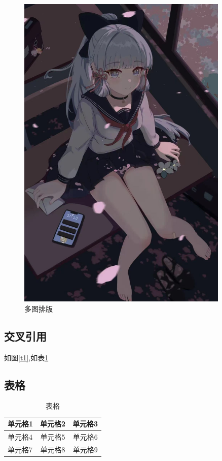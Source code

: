 \documentclass[12pt]{ctexart}
\begin{document}
\begin{figure}[H]
{\begin{minipage}{0.5\textwidth}
			\includegraphics[width=0.9\textwidth]{图片1.jpg}
		\end{minipage}
	}
	\caption{多图排版}
	\label{t2}
\end{figure}

\subsection{交叉引用}
如图\ref{t1},如表\ref{b1}

\subsection{表格}

\begin{table}[H]
\centering
\caption{表格}
	\begin{tabular}{|p{2cm}|c|c|}
		\hline
		单元格1&单元格2&单元格3\\
		\hline\hline
		单元格4&单元格5&单元格6\\
		\hline
		单元格7&单元格8&单元格9\\
		\hline
	\end{tabular}\label{b1}
\end{table}
\end{document}
